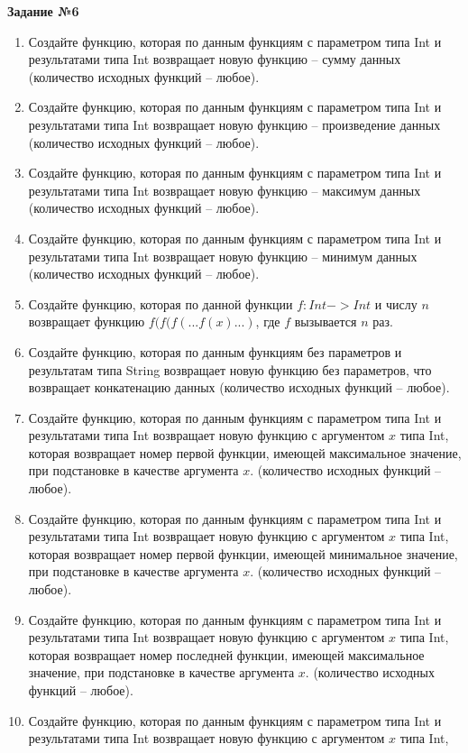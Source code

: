 \textbf{Задание №6} 



\begin{enumerate}
	\item Создайте функцию, которая по данным функциям с параметром типа Int и результатами типа Int возвращает новую функцию -- сумму данных 
		(количество исходных функций -- любое).
	\item Создайте функцию, которая по данным функциям с параметром типа Int и результатами типа Int возвращает новую функцию -- произведение данных
		(количество исходных функций -- любое).
	\item Создайте функцию, которая по данным функциям с параметром типа Int и результатами типа Int возвращает новую функцию -- максимум данных
		(количество исходных функций -- любое).
  	\item Создайте функцию, которая по данным функциям с параметром типа Int и результатами типа Int возвращает новую функцию -- минимум данных
		(количество исходных функций -- любое).
	\item Создайте функцию, которая по данной функции $f:Int->Int$ и числу $n$ возвращает функцию $f(f(f(...f(x)...)$, где $f$ вызывается $n$ раз.
  	\item Создайте функцию, которая по данным функциям без параметров и результатам типа String возвращает новую функцию без параметров,
		что возвращает конкатенацию данных (количество исходных функций -- любое).
	\item Создайте функцию, которая по данным функциям с параметром типа Int и результатами типа Int возвращает новую функцию с аргументом $x$ типа Int,
		которая возвращает номер первой функции, имеющей максимальное значение, при подстановке в качестве аргумента $x$.
		(количество исходных функций -- любое).
	\item Создайте функцию, которая по данным функциям с параметром типа Int и результатами типа Int возвращает новую функцию с аргументом $x$ типа Int,
		которая возвращает номер первой функции, имеющей минимальное значение, при подстановке в качестве аргумента $x$.
		(количество исходных функций -- любое).
	\item Создайте функцию, которая по данным функциям с параметром типа Int и результатами типа Int возвращает новую функцию с аргументом $x$ типа Int,
		которая возвращает номер последней функции, имеющей максимальное значение, при подстановке в качестве аргумента $x$.
		(количество исходных функций -- любое).
	\item Создайте функцию, которая по данным функциям с параметром типа Int и результатами типа Int возвращает новую функцию с аргументом $x$ типа Int,

\end{enumerate}
